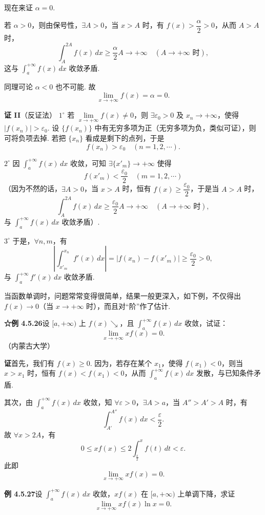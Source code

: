 \documentclass[UTF8, 12pt, fontset=fandol, oneside]{ctexart}
\begin{document}
现在来证 $\alpha=0$.

若 $\alpha>0$，则由保号性，$\exists A>0$，当 $x>A$ 时，有 $f(x)>\dfrac\alpha2>0$，从而 $A>A$ 时，
\[
\int_A^{2A}f(x)\,dx\ge\frac\alpha2A\longrightarrow+\infty\quad(A\to+\infty\text{ 时}),
\]
这与 $\displaystyle\int_a^{+\infty}f(x)\,dx$ 收敛矛盾.

同理可论 $\alpha<0$ 也不可能. 故
\[
\lim_{x\to+\infty}f(x)=\alpha=0.
\]

\noindent\textbf{证 II}\quad （反证法）
$1^\circ$ 若 $\lim\limits_{x\to+\infty}f(x)\ne0$，则 $\exists\varepsilon_0>0$ 及 $x_n\to+\infty$，使得 $|f(x_n)|>\varepsilon_0$. 设 $\{f(x_n)\}$ 中有无穷多项为正（无穷多项为负，类似可证），则可将负项去掉. 若把 $\{x_n\}$ 看成是剩下的点列，于是
\[
f(x_n)>\varepsilon_0\quad(n=1,2,\cdots).
\]

$2^\circ$ 因 $\displaystyle\int_a^{+\infty}f(x)\,dx$ 收敛，可知 $\exists\{x'_m\}\to+\infty$ 使得
\[
f(x'_m)<\frac{\varepsilon_0}2\quad(m=1,2,\cdots)
\]
（因为不然的话，$\exists A>0$，当 $x>A$ 时，恒有 $f(x)\ge\dfrac{\varepsilon_0}2$，于是当 $A>A$ 时，
\[
\int_A^{2A}f(x)\,dx\ge\frac{\varepsilon_0}2A\longrightarrow+\infty\quad(A\to+\infty\text{ 时}),
\]
与 $\displaystyle\int_a^{+\infty}f(x)\,dx$ 收敛矛盾）.

$3^\circ$ 于是，$\forall n,m$，有
\[
\left|\int_{x'_m}^{x_n}f'(x)\,dx\right|
=|f(x_n)-f(x'_m)|\ge\frac{\varepsilon_0}2>0,
\]
与 $\displaystyle\int_a^{+\infty}f'(x)\,dx$ 收敛矛盾.

当函数单调时，问题常常变得很简单，结果一般更深入，如下例，不仅得出 $f(x)\to0$（当 $x\to+\infty$ 时），而且对“阶”作了估计.

\noindent\textbf{☆例 4.5.26}\quad 设 $[a,+\infty)$ 上 $f(x)\searrow$，且 $\displaystyle\int_a^{+\infty}f(x)\,dx$ 收敛，试证：
\[
\lim_{x\to+\infty}xf(x)=0.
\]
（内蒙古大学）

\noindent\textbf{证}\quad 首先，我们有 $f(x)\ge0$. 因为，若存在某个 $x_1$，使得 $f(x_1)<0$，则当 $x>x_1$ 时，恒有 $f(x)<f(x_1)<0$，从而 $\displaystyle\int_a^{+\infty}f(x)\,dx$ 发散，与已知条件矛盾.

其次，由 $\displaystyle\int_a^{+\infty}f(x)\,dx$ 收敛，知 $\forall\varepsilon>0$，$\exists A>a$，当 $A''>A'>A$ 时，有
\[
\int_{A'}^{A''}f(x)\,dx<\frac\varepsilon2.
\]
故 $\forall x>2A$，有
\[
0\le xf(x)\le2\int_{\frac x2}^xf(t)\,dt<\varepsilon.
\]
此即
\[
\lim_{x\to+\infty}xf(x)=0.
\]

\noindent\textbf{例 4.5.27}\quad 设 $\displaystyle\int_a^{+\infty}f(x)\,dx$ 收敛，$xf(x)$ 在 $[a,+\infty)$ 上单调下降，求证
\[
\lim_{x\to+\infty}xf(x)\ln x=0.
\]
\end{document}
